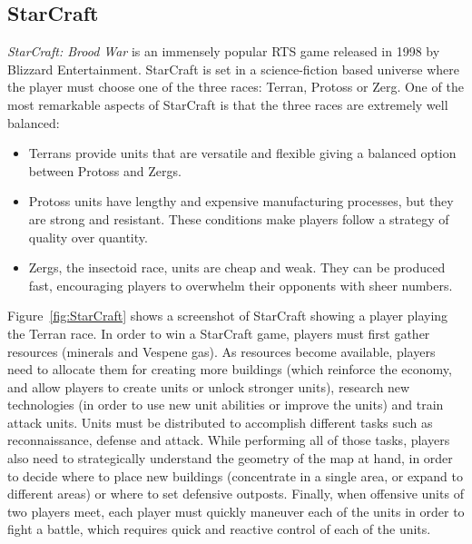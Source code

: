 \documentclass[journal]{IEEEtran}
\begin{document}
\subsection{StarCraft}\label{subsec:StarCraft}

{\em StarCraft: Brood War} is an immensely popular RTS game released in 1998 by Blizzard Entertainment. StarCraft is set in a science-fiction based universe where the player must choose one of the three races: Terran, Protoss or Zerg. One of the most remarkable aspects of StarCraft is that the three races are extremely well balanced:

\begin{itemize}
	\item Terrans provide units that are versatile and flexible giving a balanced option between Protoss and Zergs.
	\item Protoss units have lengthy and expensive manufacturing processes, but they are strong and resistant. These conditions make players follow a strategy of quality over quantity.
	\item Zergs, the insectoid race, units are cheap and weak. They can be produced fast, encouraging players to overwhelm their opponents with sheer numbers.
\end{itemize}


Figure~\ref{fig:StarCraft} shows a screenshot of StarCraft showing a player playing the Terran race. In order to win a StarCraft game, players must first gather resources (minerals and Vespene gas). As resources become available, players need to allocate them for creating more buildings (which reinforce the economy, and allow players to create units or unlock stronger units), research new technologies (in order to use new unit abilities or improve the units) and train attack units. Units must be distributed to accomplish different tasks such as reconnaissance, defense and attack. While performing all of those tasks, players also need to strategically understand the geometry of the map at hand, in order to decide where to place new buildings (concentrate in a single area, or expand to different areas) or where to set defensive outposts. Finally, when offensive units of two players meet, each player must quickly maneuver each of the units in order to fight a battle, which requires quick and reactive control of each of the units.
\end{document}
